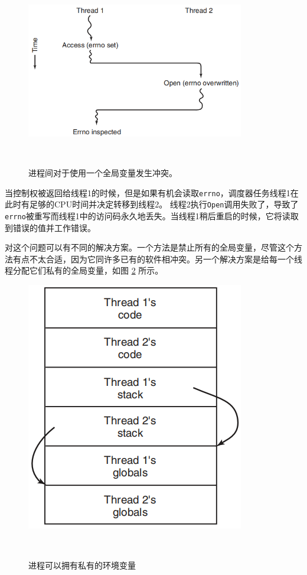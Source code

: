 	\begin{figure}[ht]\small
		\centering
		\includegraphics[width=0.85\textwidth]{FIG/2-19.png}
		\caption{进程间对于使用一个全局变量发生冲突。}　\label{fig:globalvariableonthreads}
	\end{figure}

	当控制权被返回给线程1的时候，但是如果有机会读取\texttt{errno}，调度器任务线程1在此时有足够的CPU时间并决定转移到线程2。
	线程2执行\texttt{Open}调用失败了，导致了\texttt{errno}被重写而线程1中的访问码永久地丢失。当线程1稍后重启的时候，它将读取到错误的值并工作错误。
	
	对这个问题可以有不同的解决方案。一个方法是禁止所有的全局变量，尽管这个方法有点不太合适，因为它同许多已有的软件相冲突。另一个解决方案是给每一个线程分配它们私有的全局变量，如图 \ref{fig:privatevariables} 所示。
	
	\begin{figure}[ht]\small
		\centering
		\includegraphics[width=0.85\textwidth]{FIG/2-20.png}
		\caption{进程可以拥有私有的环境变量}　\label{fig:privatevariables}
	\end{figure}

